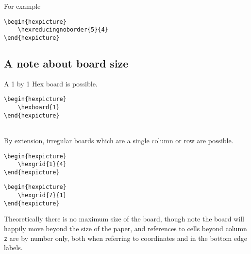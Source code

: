 \documentclass[a4paper,12pt]{article}
\begin{document}
    For example
    
    \begin{verbatim}\begin{hexpicture}
    \hexreducingnoborder{5}{4}
\end{hexpicture}\end{verbatim}
    
    \begin{hexpicture}
    \end{hexpicture}
    
    \subsection{A note about board size}
    
    A 1 by 1 Hex board is possible.
    
    \begin{verbatim}\begin{hexpicture}
    \hexboard{1}
\end{hexpicture}\end{verbatim}
    
    \begin{hexpicture}
    \end{hexpicture}\\

    By extension, irregular boards which are a single column or row are possible.

    \begin{verbatim}\begin{hexpicture}
    \hexgrid{1}{4}
\end{hexpicture}\end{verbatim}

    \begin{hexpicture}
    \end{hexpicture}

    \begin{verbatim}\begin{hexpicture}
    \hexgrid{7}{1}
\end{hexpicture}\end{verbatim}

    \begin{hexpicture}
    \end{hexpicture}
    
    Theoretically there is no maximum size of the board, though note the board will happily move beyond the size of the paper, and references to cells beyond column \verb|z| are by number only, both when referring to coordinates and in the bottom edge labels.
    
\end{document}
